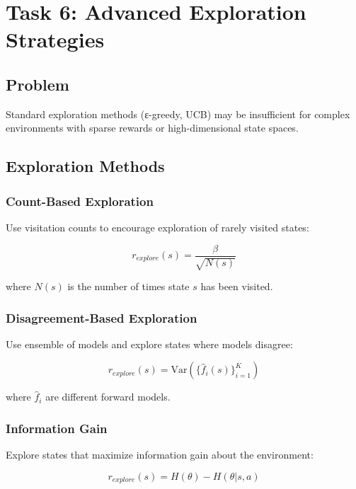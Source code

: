 \documentclass[12pt]{article}
\begin{document}
{{{\section{Task 6: Advanced Exploration Strategies}

\subsection{Problem}

Standard exploration methods (ε-greedy, UCB) may be insufficient for complex environments with sparse rewards or high-dimensional state spaces.

\subsection{Exploration Methods}

\subsubsection{Count-Based Exploration}

Use visitation counts to encourage exploration of rarely visited states:

\begin{equation}
r_{explore}(s) = \frac{\beta}{\sqrt{N(s)}}
\end{equation}

where $N(s)$ is the number of times state $s$ has been visited.

\subsubsection{Disagreement-Based Exploration}

Use ensemble of models and explore states where models disagree:

\begin{equation}
r_{explore}(s) = \text{Var}(\{\hat{f}_i(s)\}_{i=1}^K)
\end{equation}

where $\hat{f}_i$ are different forward models.

\subsubsection{Information Gain}

Explore states that maximize information gain about the environment:

\begin{equation}
r_{explore}(s) = H(\theta) - H(\theta | s, a)
\end{equation}

}}}
\end{document}
